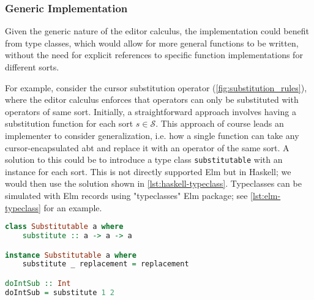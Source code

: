 \documentclass[sigplan]{acmart}
\newcommand{\abt}{\textsf{abt}\xspace}
\begin{document}

\subsubsection{Generic Implementation}
Given the generic nature of the editor calculus, the implementation could
benefit from type classes, which would allow for more general functions
to be written, without the need for explicit references to specific
function implementations for different sorts.

For example, consider the cursor substitution operator
(\cref{fig:substitution_rules}), where the editor calculus enforces
that operators can only be substituted with operators of same
sort. Initially, a straightforward approach involves having a
substitution function for each sort $s \in \mathcal{S}$.  This
approach of course leads an implementer to consider generalization,
i.e. how a single function can take any cursor-encapsulated \abt and
replace it with an operator of the same sort. A solution to this could
be to introduce a type class 
\texttt{substitutable} with an instance for each sort.  This is
not directly supported Elm but in Haskell; we would then use the
solution shown in \cref{lst:haskell-typeclass}.  Typeclasses can
be simulated with Elm records using "typeclasses"
Elm package\cite{elm-typeclass-package}; see 
\cref{lst:elm-typeclass} for an example.  %


\begin{lstlisting}[language=Haskell,style=inline,caption={Haskell typeclass example},label={lst:haskell-typeclass}]
class Substitutable a where
    substitute :: a -> a -> a

instance Substitutable a where
    substitute _ replacement = replacement

doIntSub :: Int
doIntSub = substitute 1 2
\end{lstlisting}
\end{document}
